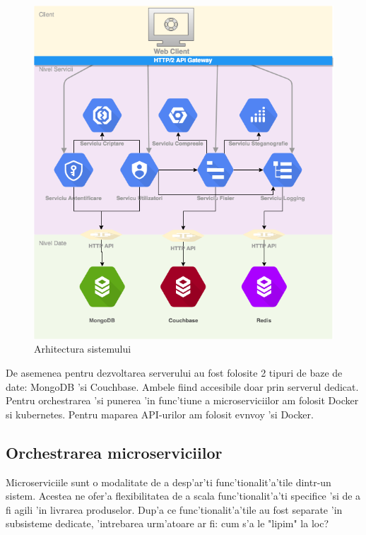\documentclass[12pt,a4paper,twoside]{report}
\begin{document}
\begin{figure}[H]
\begin{center}
\advance\leftskip-3cm
\advance\rightskip-3cm
\includegraphics[keepaspectratio=true,scale=0.6]{img/diagrama_system.png}
\caption{Arhitectura sistemului}
\label{system_architecture}
\end{center}
\end{figure}
De asemenea pentru dezvoltarea serverului au fost folosite 2 tipuri de baze de date: MongoDB 'si Couchbase. Ambele fiind accesibile doar prin serverul dedicat. Pentru orchestrarea 'si punerea 'in func'tiune a microserviciilor am folosit Docker si kubernetes. Pentru maparea API-urilor am folosit evnvoy 'si Docker.
\subsection{Orchestrarea microserviciilor}
 Microserviciile sunt o modalitate de a desp'ar'ti func'tionalit'a'tile dintr-un sistem. Acestea ne ofer'a flexibilitatea de a scala func'tionalit'a'ti specifice 'si de a fi agili 'in livrarea produselor.
Dup'a ce func'tionalit'a'tile au fost separate 'in subsisteme dedicate, 'intrebarea urm'atoare ar fi: cum s'a le "lipim" la loc?
\end{document}
